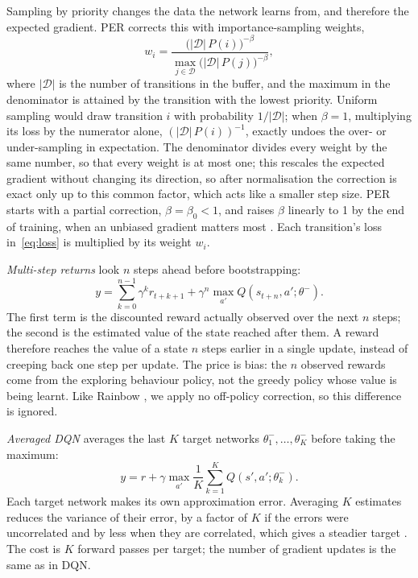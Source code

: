 \documentclass[conference,a4paper]{IEEEtran}
\begin{document}
Sampling by priority changes the data the network learns from, and therefore the expected gradient. PER corrects this
with importance-sampling weights,
\begin{equation}
w_i=\frac{\big(|\mathcal{D}|\,P(i)\big)^{-\beta}}{\max_{j\in\mathcal{D}}\big(|\mathcal{D}|\,P(j)\big)^{-\beta}},
\end{equation}
where $|\mathcal{D}|$ is the number of transitions in the buffer, and the maximum in the denominator is attained by
the transition with the lowest priority. Uniform sampling would draw transition $i$ with probability
$1/|\mathcal{D}|$; when $\beta=1$, multiplying its loss by the numerator alone, $(|\mathcal{D}|\,P(i))^{-1}$, exactly
undoes the over- or under-sampling in expectation. The denominator divides every weight by the same number, so that
every weight is at most one; this rescales the expected gradient without changing its direction, so after
normalisation the correction is exact only up to this common factor, which acts like a smaller step size. PER starts with a partial
correction, $\beta=\beta_0<1$, and raises $\beta$ linearly to 1 by the end of training, when an unbiased gradient
matters most \citep{schaul2016prioritized}. Each transition's loss in~\eqref{eq:loss} is multiplied by its weight $w_i$.

\emph{Multi-step returns} \citep{hernandezgarcia2019understanding,sutton2018reinforcement} look $n$ steps ahead before
bootstrapping:
\begin{equation}
y=\sum_{k=0}^{n-1}\gamma^k r_{t+k+1}+\gamma^n\max_{a'}Q(s_{t+n},a';\theta^-).
\end{equation}
The first term is the discounted reward actually observed over the next $n$ steps; the second is the estimated value
of the state reached after them. A reward therefore reaches the value of a state $n$ steps earlier in a single update,
instead of creeping back one step per update. The price is bias: the $n$ observed rewards come from the exploring
behaviour policy, not the greedy policy whose value is being learnt. Like Rainbow \citep{hessel2018rainbow}, we apply
no off-policy correction, so this difference is ignored.

\emph{Averaged DQN} \citep{anschel2017averaged} averages the last $K$ target networks $\theta^-_1,\dots,\theta^-_K$
before taking the maximum:
\begin{equation}
y=r+\gamma\max_{a'}\frac{1}{K}\sum_{k=1}^{K}Q(s',a';\theta^-_k).
\label{eq:avg}
\end{equation}
Each target network makes its own approximation error. Averaging $K$ estimates reduces the variance of their error,
by a factor of $K$ if the errors were uncorrelated and by less when they are correlated, which gives a steadier
target \citep{anschel2017averaged}. The cost is $K$ forward passes per target; the number of gradient updates is the
same as in DQN.
\end{document}
